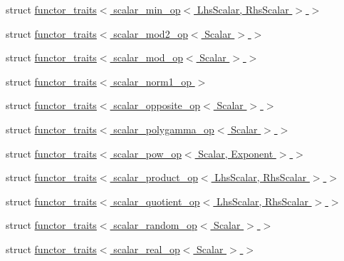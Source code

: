 \begin{DoxyCompactItemize}
\item 
struct \hyperlink{struct_eigen_1_1internal_1_1functor__traits_3_01scalar__min__op_3_01_lhs_scalar_00_01_rhs_scalar_01_4_01_4}{functor\+\_\+traits$<$ scalar\+\_\+min\+\_\+op$<$ Lhs\+Scalar, Rhs\+Scalar $>$ $>$}
\item 
struct \hyperlink{struct_eigen_1_1internal_1_1functor__traits_3_01scalar__mod2__op_3_01_scalar_01_4_01_4}{functor\+\_\+traits$<$ scalar\+\_\+mod2\+\_\+op$<$ Scalar $>$ $>$}
\item 
struct \hyperlink{struct_eigen_1_1internal_1_1functor__traits_3_01scalar__mod__op_3_01_scalar_01_4_01_4}{functor\+\_\+traits$<$ scalar\+\_\+mod\+\_\+op$<$ Scalar $>$ $>$}
\item 
struct \hyperlink{struct_eigen_1_1internal_1_1functor__traits_3_01scalar__norm1__op_01_4}{functor\+\_\+traits$<$ scalar\+\_\+norm1\+\_\+op $>$}
\item 
struct \hyperlink{struct_eigen_1_1internal_1_1functor__traits_3_01scalar__opposite__op_3_01_scalar_01_4_01_4}{functor\+\_\+traits$<$ scalar\+\_\+opposite\+\_\+op$<$ Scalar $>$ $>$}
\item 
struct \hyperlink{struct_eigen_1_1internal_1_1functor__traits_3_01scalar__polygamma__op_3_01_scalar_01_4_01_4}{functor\+\_\+traits$<$ scalar\+\_\+polygamma\+\_\+op$<$ Scalar $>$ $>$}
\item 
struct \hyperlink{struct_eigen_1_1internal_1_1functor__traits_3_01scalar__pow__op_3_01_scalar_00_01_exponent_01_4_01_4}{functor\+\_\+traits$<$ scalar\+\_\+pow\+\_\+op$<$ Scalar, Exponent $>$ $>$}
\item 
struct \hyperlink{struct_eigen_1_1internal_1_1functor__traits_3_01scalar__product__op_3_01_lhs_scalar_00_01_rhs_scalar_01_4_01_4}{functor\+\_\+traits$<$ scalar\+\_\+product\+\_\+op$<$ Lhs\+Scalar, Rhs\+Scalar $>$ $>$}
\item 
struct \hyperlink{struct_eigen_1_1internal_1_1functor__traits_3_01scalar__quotient__op_3_01_lhs_scalar_00_01_rhs_scalar_01_4_01_4}{functor\+\_\+traits$<$ scalar\+\_\+quotient\+\_\+op$<$ Lhs\+Scalar, Rhs\+Scalar $>$ $>$}
\item 
struct \hyperlink{struct_eigen_1_1internal_1_1functor__traits_3_01scalar__random__op_3_01_scalar_01_4_01_4}{functor\+\_\+traits$<$ scalar\+\_\+random\+\_\+op$<$ Scalar $>$ $>$}
\item 
struct \hyperlink{struct_eigen_1_1internal_1_1functor__traits_3_01scalar__real__op_3_01_scalar_01_4_01_4}{functor\+\_\+traits$<$ scalar\+\_\+real\+\_\+op$<$ Scalar $>$ $>$}
\item 

\end{DoxyCompactItemize}
